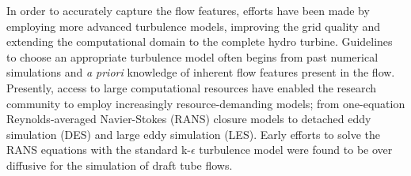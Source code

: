 In order to accurately capture the flow features, efforts have been made by employing more advanced turbulence models, improving the grid quality and extending the computational domain to the complete hydro turbine. Guidelines to choose an appropriate turbulence model often begins from past numerical simulations and {\it a priori} knowledge of inherent flow features present in the flow. Presently, access to large computational resources have enabled the research community to employ increasingly resource-demanding models; from one-equation Reynolds-averaged Navier-Stokes (RANS) closure models to detached eddy simulation (DES) and large eddy simulation (LES).
Early efforts to solve the RANS equations with the standard k-$\epsilon$ turbulence model \cite{sick2002cfd, ruprecht2002simulation} were found to be over diffusive for the simulation of draft tube flows. 
